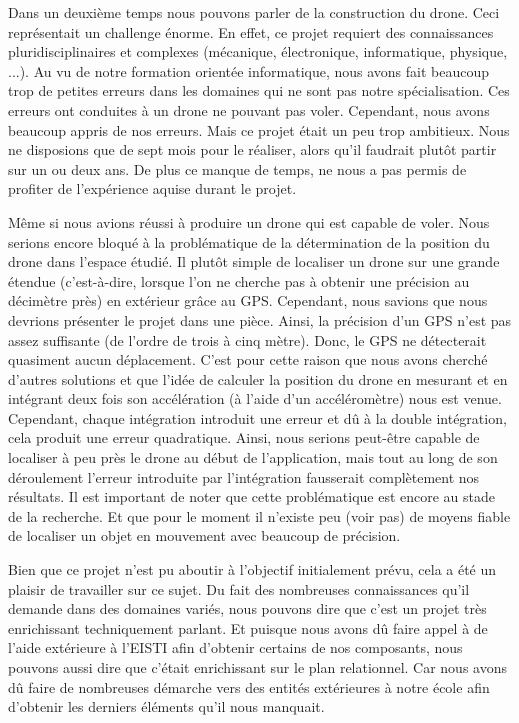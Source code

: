 \documentclass[a4paper,10pt]{report}
\begin{document}
    Dans un deuxième temps nous pouvons parler de la construction du drone. 
Ceci représentait un challenge énorme. En effet, ce projet requiert des 
connaissances pluridisciplinaires et complexes (mécanique, électronique, 
informatique, physique, ...). Au vu de notre formation orientée informatique, 
nous avons fait beaucoup trop de petites erreurs dans les domaines qui ne sont 
pas notre spécialisation. Ces erreurs ont conduites à un drone ne pouvant pas 
voler. Cependant, nous avons beaucoup appris de nos erreurs. Mais ce projet 
était un peu trop ambitieux. Nous ne disposions que de sept mois pour le 
réaliser, alors qu'il faudrait plutôt partir sur un ou deux ans. De plus ce 
manque de temps, ne nous a pas permis de profiter de l'expérience aquise durant 
le projet.

    Même si nous avions réussi à produire un drone qui est capable de voler. 
Nous serions encore bloqué à la problématique de la détermination de la 
position du drone dans l'espace étudié. Il plutôt simple de localiser un drone 
sur une grande étendue (c'est-à-dire, lorsque l'on ne cherche pas à obtenir une 
précision au décimètre près) en extérieur grâce au GPS. Cependant, nous savions 
que nous devrions présenter le projet dans une pièce. Ainsi, la précision d'un 
GPS n'est pas assez suffisante (de l'ordre de trois à cinq mètre). Donc, le GPS 
ne détecterait quasiment aucun déplacement. C'est pour cette raison que nous 
avons cherché d'autres solutions et que l'idée de calculer la position du drone 
en mesurant et en intégrant deux fois son accélération (à l'aide d'un 
accéléromètre) nous est venue. Cependant, chaque intégration introduit une 
erreur et dû à la double intégration, cela produit une erreur quadratique. 
Ainsi, nous serions peut-être capable de localiser à peu près le drone au début 
de l'application, mais tout au long de son déroulement l'erreur introduite par 
l'intégration fausserait complètement nos résultats. Il est important de noter 
que cette problématique est encore au stade de la recherche. Et que pour le 
moment il n'existe peu (voir pas) de moyens fiable de localiser un objet en 
mouvement avec beaucoup de précision.

    Bien que ce projet n'est pu aboutir à l'objectif initialement prévu, cela a 
été un plaisir de travailler sur ce sujet. Du fait des nombreuses connaissances 
qu'il demande dans des domaines variés, nous pouvons dire que c'est un projet 
très enrichissant techniquement parlant. Et puisque nous avons dû faire appel à 
de l'aide extérieure à l'EISTI afin d'obtenir certains de nos composants, nous 
pouvons aussi dire que c'était enrichissant sur le plan relationnel. Car nous 
avons dû faire de nombreuses démarche vers des entités extérieures à notre 
école afin d'obtenir les derniers éléments qu'il nous manquait.
\end{document}
